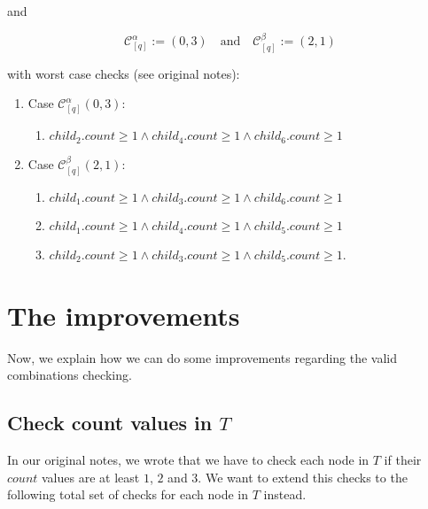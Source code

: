 \documentclass{article}
\newtheorem*{theorem A}{Theorem A}
\newtheorem*{theorem B}{N\"olker's Theorem}
\theoremstyle{remark}
\theoremstyle{remark}
\begin{document}
and 

\begin{equation}
    \mathcal{C}^{\alpha}_{[q]} := \left(0,3\right) \quad \mathrm{and} \quad \mathcal{C}^{\beta}_{[q]} := \left(2,1\right)
\label{eq:ruleCase_02}
\end{equation}

with worst case checks (see original notes):

\begin{enumerate}
    \item Case $\mathcal{C}^{\alpha}_{[q]}\left(0,3\right)$:
        \begin{enumerate}
            \item $child_{2}.count \geq 1 \wedge child_{4}.count \geq 1 \wedge child_{6}.count \geq 1$
        \end{enumerate}

    \item Case $\mathcal{C}^{\beta}_{[q]}\left(2,1\right)$:
        \begin{enumerate}
            \item $child_{1}.count \geq 1 \wedge child_{3}.count \geq 1 \wedge child_{6}.count \geq 1$
            \item $child_{1}.count \geq 1 \wedge child_{4}.count \geq 1 \wedge child_{5}.count \geq 1$
            \item $child_{2}.count \geq 1 \wedge child_{3}.count \geq 1 \wedge child_{5}.count \geq 1$.
        \end{enumerate}
\end{enumerate}
\section{The improvements}
\label{s:theimprovements}
Now, we explain how we can do some improvements regarding the valid combinations checking.
\subsection{Check count values in $T$}
\label{ss:checkcountvaluesinT}
In our original notes, we wrote that we have to check each node in $T$ if their $count$ values are at least $1$, $2$ and $3$. We want to extend this checks to the following total set of checks for each node in $T$ instead.
\end{document}
